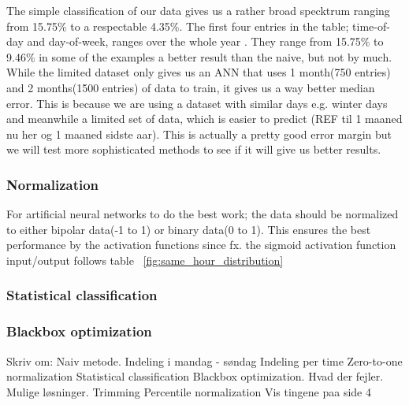 The simple classification of our data gives us a rather broad specktrum ranging from 15.75\% to a respectable 4.35\%. The first four entries in the table; time-of-day and day-of-week, ranges over the whole year . They range from 15.75\% to 9.46\% in some of the examples a better result than the naive, but not by much. While the limited dataset only gives us an ANN that uses 1 month(750 entries) and 2 months(1500 entries) of data to train, it gives us a way better median error. This is because we are using a dataset with similar days e.g. winter days and meanwhile a limited set of data, which is easier to predict (REF til 1 maaned nu her og 1 maaned sidste aar). This is actually a pretty good error margin but we will test more sophisticated methods to see if it will give us better results. 
\subsubsection{Normalization}
For artificial neural networks to do the best work; the data should be normalized to either bipolar data(-1 to 1) or binary data(0 to 1). This ensures the best performance by the activation functions since fx. the sigmoid activation function input/output follows table ~\ref{fig:same_hour_distribution}

\begin{table}[!ht]
\centering  %
\caption{Results from the simple classification approach} %
\label{table:naiveTrainingApproach} %
\end{table}

\subsubsection{Statistical classification}

\subsubsection{Blackbox optimization}

Skriv om:
	Naiv metode.
	Indeling i mandag - søndag
	Indeling per time
	Zero-to-one normalization
	Statistical classification
	Blackbox optimization.
	Hvad der fejler.
	Mulige løsninger.
	Trimming
	Percentile normalization
	Vis tingene paa side 4
